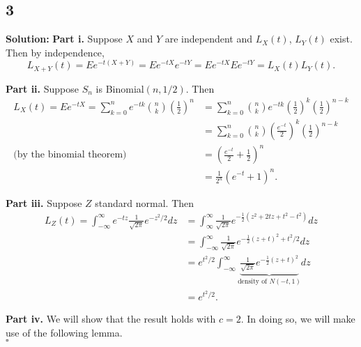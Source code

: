 \documentclass[12pt]{article}
\newcounter{ProofCounter}
\newenvironment{Solution}{\stepcounter{ProofCounter}\textbf{Solution:}}{\hfill$\square$}
\begin{document}

\newpage
\subsection*{3}
\begin{Solution}
  \textbf{Part i.} Suppose $X$ and $Y$ are independent and $L_X(t)$, $L_Y(t)$ exist. Then by independence,
  \[
    L_{X + Y}(t) = Ee^{-t(X + Y)} = Ee^{-tX}e^{-tY} = Ee^{-tX}Ee^{-tY} = L_X(t) L_Y(t).
  \]

  \textbf{Part ii.} Suppose $S_n$ is Binomial$(n, 1/2)$. Then
  \begin{align*}
    L_{X}(t) = Ee^{-tX} = \sum_{k=0}^{n} e^{-tk} \binom{n}{k} \left( \frac{1}{2} \right)^n & = \sum_{k=0}^{n} \binom{n}{k} e^{-tk} \left( \frac{1}{2} \right)^k \left( \frac{1}{2} \right)^{n-k} \\
    & = \sum_{k=0}^{n} \binom{n}{k} \left( \frac{e^{-t}}{2} \right)^k \left( \frac{1}{2} \right)^{n-k} \\
    \text{(by the binomial theorem)} \ \ \ & = \left( \frac{e^{-t}}{2} + \frac{1}{2} \right)^{n} \\
    & = \frac{1}{2^{n}} \left( e^{-t} + 1 \right)^{n}.
  \end{align*}

  \textbf{Part iii.} Suppose $Z$ standard normal. Then
  \begin{align*}
    L_Z(t) = \int_{-\infty}^{\infty} e^{-tz} \frac{1}{\sqrt{2\pi}} e^{-z^2 / 2} dz & = \int_{\infty}^{\infty} \frac{1}{\sqrt{2\pi}} e^{-\frac{1}{2}(z^2 + 2tz + t^2 - t^2)} dz \\
    & = \int_{-\infty}^{\infty} \frac{1}{\sqrt{2\pi}} e^{-\frac{1}{2}(z + t)^2 + t^2 / 2} dz \\
    & = e^{t^2 / 2} \int_{-\infty}^{\infty}\underbrace{ \frac{1}{\sqrt{2\pi}} e^{-\frac{1}{2}(z + t)^2} }_{\text{density of $N(-t, 1)$}} dz \\
    & = e^{t^2 / 2}.
  \end{align*}

  \textbf{Part iv.} We will show that the result holds with $c = 2$. In doing so, we will make use of the following lemma. \\


\end{Solution}
\end{document}

